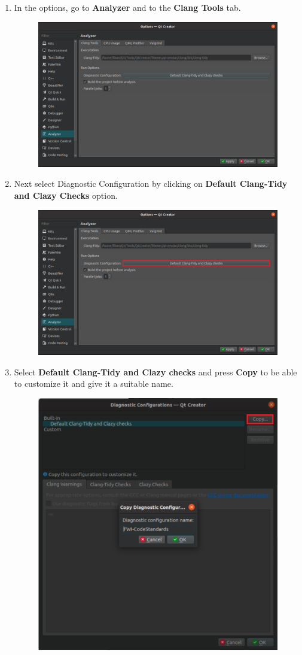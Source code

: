 \documentclass[10pt]{article}
\begin{document}
\begin{enumerate}
\item In the options, go to \textbf{Analyzer} and to the \textbf{Clang Tools} tab.
\begin{figure}[h!]
\centering
\includegraphics[width=0.6 \textwidth]{clang-tidy4.png}
\end{figure}

\item Next select Diagnostic Configuration by clicking on \textbf{Default Clang-Tidy and Clazy Checks} option.
\begin{figure}[h!]
\centering
\includegraphics[width=0.7 \textwidth]{clang-tidy5.png}
\end{figure}

\item Select \textbf{Default Clang-Tidy and Clazy checks} and press \textbf{Copy} to be able to customize it
and give it a suitable name.
\begin{figure}[h!]
\centering
\includegraphics[width=0.6 \textwidth]{clang-tidy6.png}
\end{figure}


\end{enumerate}
\end{document}
